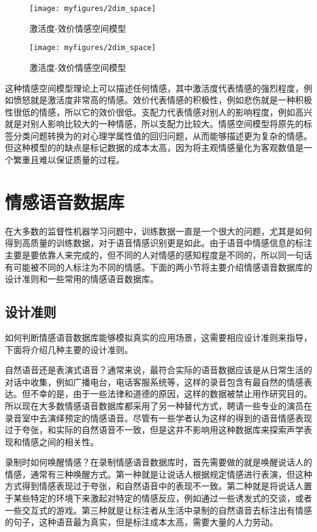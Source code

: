\begin{figure}[H] %
    \centering
    \texttt{[image: myfigures/2dim\_space]}
    \caption{激活度-效价情感空间模型}
    \label{fig:xfig1}
\end{figure}

\begin{figure}[H] %
    \centering
    \texttt{[image: myfigures/2dim\_space]}
    \caption{激活度-效价情感空间模型}
    \label{fig:xfig2}
\end{figure}

这种情感空间模型理论上可以描述任何情感，其中激活度代表情感的强烈程度，例如愤怒就是激活度非常高的情感。效价代表情感的积极性，例如悲伤就是一种积极性很低的情感，所以它的效价很低。支配力代表情感对别人的影响程度，例如高兴就是对别人影响比较大的一种情感，所以支配力比较大。情感空间模型将原先的标签分类问题转换为的对心理学属性值的回归问题，从而能够描述更为复杂的情感。但这种模型的的缺点是标记数据的成本太高，因为将主观情感量化为客观数值是一个繁重且难以保证质量的过程。

\section{情感语音数据库}
\label{sec:emo_speech_database}
在大多数的监督性机器学习问题中，训练数据一直是一个很大的问题，尤其是如何得到高质量的训练数据，对于语音情感识别更是如此。由于语音中情感信息的标注主要是要依靠人来完成的，但不同的人对情感的感知程度是不同的，所以同一句话有可能被不同的人标注为不同的情感。下面的两小节将主要介绍情感语音数据库的设计准则和一些常用的情感语音数据库。

\subsection{设计准则}
\label{ssec:design_criteria}
如何判断情感语音数据库能够模拟真实的应用场景，这需要相应设计准则来指导，下面将介绍几种主要的设计准则。

自然语音还是表演式语音？通常来说，最符合实际的语音数据应该是从日常生活的对话中收集，例如广播电台，电话客服系统等，这样的录音包含有最自然的情感表达。但不幸的是，由于一些法律和道德的原因，这样的数据被禁止用作研究目的。所以现在大多数情感语音数据库都采用了另一种替代方式，聘请一些专业的演员在录音室中去演绎预定的情感语音。尽管有一些学者认为这样的得到的语音情感表现过于夸张，和实际的自然语音不一致，但是这并不影响用这种数据库来探索声学表现和情感之间的相关性。

录制时如何唤醒情感？在录制情感语音数据库时，首先需要做的就是唤醒说话人的情感，通常有三种唤醒方式。第一种就是让说话人根据规定情感进行表演，但这种方式得到情感表现过于夸张，和自然语音中的表现不一致。第二种就是将说话人置于某些特定的环境下来激起对特定的情感反应，例如通过一些诱发式的交谈，或者一些交互式的游戏。第三种就是让标注者从生活中录制的自然语音去标注出有情感的句子，这种语音最为真实，但是标注成本太高，需要大量的人力劳动。

